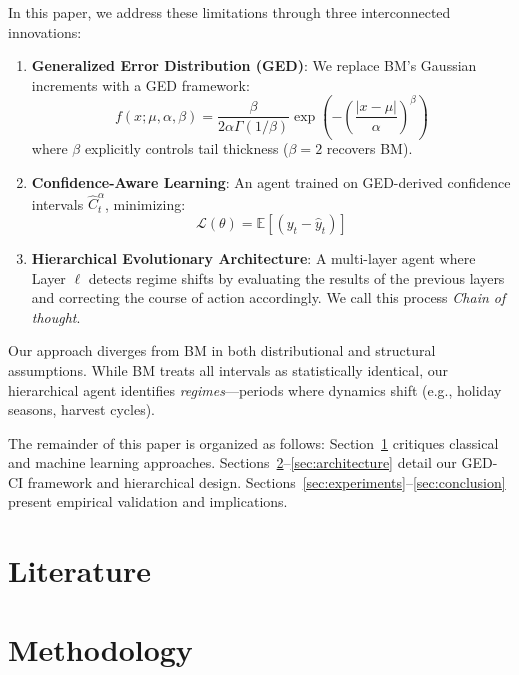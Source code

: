 \documentclass[12pt]{article}
\begin{document}
In this paper, we address these limitations through three interconnected innovations:
\begin{enumerate}
    \item \textbf{Generalized Error Distribution (GED)}: We replace BM's Gaussian increments with a GED framework:
    \begin{equation}
        f(x; \mu, \alpha, \beta) = \frac{\beta}{2\alpha\Gamma(1/\beta)} \exp\left(-\left(\frac{|x-\mu|}{\alpha}\right)^\beta\right)
    \end{equation}
    where $\beta$ explicitly controls tail thickness ($\beta=2$ recovers BM).
    
    \item \textbf{Confidence-Aware Learning}: An agent trained on GED-derived confidence intervals $\hat{C}_t^\alpha$, minimizing:
    \begin{equation}
        \mathscr{L}(\theta) = \mathbb{E}\left[ (y_t - \hat{y}_t) \right]
    \end{equation}
    
\item \textbf{Hierarchical Evolutionary Architecture}: A multi-layer agent where Layer $\ell$ detects regime shifts by evaluating the results of the previous layers and correcting the course of action accordingly. We call this process \emph{Chain of thought}.
\end{enumerate}

Our approach diverges from BM in both distributional and structural assumptions. While BM treats all intervals as statistically identical, our hierarchical agent identifies \emph{regimes}---periods where dynamics shift (e.g., holiday seasons, harvest cycles). 

The remainder of this paper is organized as follows: Section~\ref{sec:literature} critiques classical and machine learning approaches. Sections~\ref{sec:methodology}--\ref{sec:architecture} detail our GED-CI framework and hierarchical design. Sections~\ref{sec:experiments}--\ref{sec:conclusion} present empirical validation and implications.

\section{Literature}
\label{sec:literature}

\section{Methodology}
\label{sec:methodology}
\end{document}
